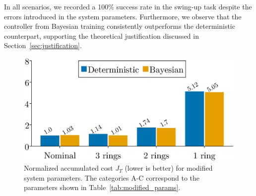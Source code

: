 In all scenarios, we recorded a 100\% success rate in the swing-up task despite
the errors introduced in the system parameters.
%
Furthermore, we observe that the controller from Bayesian training consistently
outperforms the deterministic counterpart, supporting the
theoretical justification discussed in Section~\ref{sec:justification}. 
\begin{figure}[H]
    \centering
    \includegraphics[width=0.6\linewidth]{./figures/idapbc_bar.eps}
    \caption{
        Normalized accumulated cost $J_{T}$ (lower is better) for
        modified system parameters.
        The categories A-C correspond to the parameters shown in
        Table~\ref{tab:modified_params}.
    }
    \label{fig:neuralidapbc_bar_plot}
\end{figure}
%


